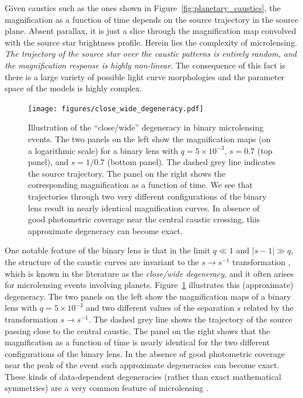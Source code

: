 \documentclass[12pt,dvipsnames]{report}
\begin{document}
Given caustics such as the ones shown in Figure~\ref{fig:planetary_caustics},
the magnification as a function of time depends on the source trajectory in the
source plane. Absent parallax, it is just a slice through the magnification map
convolved with the source star brightness profile. Herein lies the
    complexity of microlensing. \emph{The trajectory of the source star over the caustic
    patterns is entirely random, and the magnification response is highly
    non-linear}. The consequence of this fact is there is a large variety of
possible light curve morphologies and the parameter space of the models is
highly complex.

\begin{figure}[!t]
    \centering
    \texttt{[image: figures/close\_wide\_degeneracy.pdf]}
    \caption{Illustration of the ``close/wide'' degeneracy in binary microlensing events.
        The two panels on the left show the magnification maps (on a logarithmic scale) for
        a binary lens with $q=5\times 10^{-3}$, $s=0.7$ (top panel), and $s=1/0.7$
        (bottom panel). The dashed grey line indicates the source trajectory. The panel
        on the right shows the corresponding magnification as a function of time.
        We see that trajectories through two very different configurations of the binary lens
        result in nearly identical magnification curves. In absence of good
        photometric coverage near the central caustic crossing, this approximate degeneracy
        can become exact.}
    \label{fig:close_wide_degeneracy}
\end{figure}


One notable feature of the binary lens is that in the limit $q\ll 1$ and
$\lvert s-1\rvert \gg q$, the structure of the caustic curves are invariant to
the $s\rightarrow s^{-1}$ transformation \citep{dominik1999}, which is known in
the literature as the \emph{close/wide degeneracy}, and it often arises for
microlensing events involving planets. Figure~\ref{fig:close_wide_degeneracy}
illustrates this (approximate) degeneracy. The two panels on the left show the
magnification maps of a binary lens with $q=5\times 10^{-3}$ and two different
values of the separation $s$ related by the transformation $s\rightarrow
    s^{-1}$. The dashed grey line shows the trajectory of the source passing close
to the central caustic. The panel on the right shows that the magnification as
a function of time is nearly identical for the two different configurations of
the binary lens. In the absence of good photometric coverage near the peak of
the event such approximate degeneracies can become exact. These kinds of data-dependent
degeneracies (rather than exact mathematical symmetries) are a very
common feature of microlensing \citep[see, for instance][]{erdl1993}.
\end{document}
